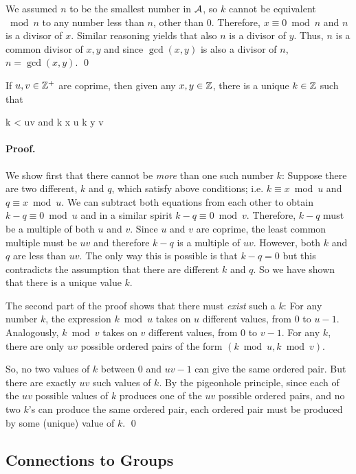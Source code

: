 We assumed $n$ to be the smallest number in $\mathcal{A}$, so $k$ cannot be equivalent $\bmod n$ to any number less than $n$, other than $0$. Therefore, $x \equiv 0 \bmod n$ and $n$ is a divisor of $x$. Similar reasoning yields that also $n$ is a divisor of $y$. Thus, $n$ is a common divisor of $x,y$ and since $\gcd(x,y)$ is also a divisor of $n$, $n = \gcd(x,y)$. \qed


\begin{theorem}
If $u,v \in \mathbb{Z}^{+}$ are coprime, then given any $x,y \in \mathbb{Z}$, there is a unique $k \in \mathbb{Z}$ such that

 \leq k < uv
\eee
%
and
\bee
k \equiv x \bmod u \qquad k \equiv y \bmod v
\eee
\end{theorem}

\paragraph{Proof.} 
We show first that there cannot be \emph{more} than one such number $k$: Suppose there are two different, $k$ and $q$, which satisfy above conditions; i.e. $k \equiv x \bmod u$ and $q \equiv x \bmod u$. We can subtract both equations from each other to obtain $k - q \equiv 0 \bmod u$ and in a similar spirit $k - q \equiv 0 \bmod v$. Therefore, $k-q$ must be a multiple of both $u$ and $v$. Since $u$ and $v$ are coprime, the least common multiple must be $uv$ and therefore $k-q$ is a multiple of $uv$. However, both $k$ and $q$ are less than $uv$. The only way this is possible is that $k-q=0$ but this contradicts the assumption that there are different $k$ and $q$. So we have shown that there is a unique value $k$.

The second part of the proof shows that there must \emph{exist} such a $k$: For any number $k$, the expression $k \bmod u$ takes on $u$ different values, from $0$ to $u-1$. Analogously, $k \bmod v$ takes on $v$ different values, from $0$ to $v-1$. For any $k$, there are only $uv$ possible ordered pairs of the form $(k \bmod u, k \bmod v)$.

So, no two values of $k$ between $0$ and $uv-1$ can give the same ordered pair. But there are exactly $uv$ such values of $k$. By the pigeonhole principle, since each of the $uv$ possible values of $k$ produces one of the $uv$ possible ordered pairs, and no two $k$’s can produce the same ordered pair, each ordered pair must be produced by some (unique) value of $k$. \qed


\subsection{Connections to Groups}

